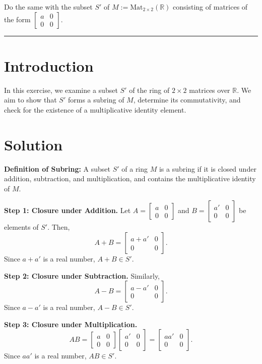 \documentclass[12pt]{amsart}
\theoremstyle{definition}
\numberwithin{equation}{section}
\newcommand{\R}{\mathbb{R}}
\begin{document}
\begin{exercise}{8} Do the same with the subset \(S'\) of \(M := \text{Mat}_{2 \times 2}(\R)\) consisting of matrices of the form \(\begin{bmatrix} a & 0 \\ 0 & 0 \end{bmatrix}\).

    \noindent\rule{\linewidth}{1pt}

    \section*{Introduction}
    
    In this exercise, we examine a subset \(S'\) of the ring of \(2 \times 2\) matrices over \(\R \). We aim to show that \(S'\) forms a subring of \(M\), determine its commutativity, and check for the existence of a multiplicative identity element.

    \section*{Solution}

    \noindent \textbf{Definition of Subring:} A subset \(S'\) of a ring \(M\) is a subring if it is closed under addition, subtraction, and multiplication, and contains the multiplicative identity of \(M\).

    \noindent \textbf{Step 1: Closure under Addition.}
    Let \(A = \begin{bmatrix} a & 0 \\ 0 & 0 \end{bmatrix}\) and \(B = \begin{bmatrix} a' & 0 \\ 0 & 0 \end{bmatrix}\) be elements of \(S'\). Then,
    \[
    A + B = \begin{bmatrix} a + a' & 0 \\ 0 & 0 \end{bmatrix}.
    \]
    Since \(a + a'\) is a real number, \(A + B \in S'\).

    \noindent \textbf{Step 2: Closure under Subtraction.}
    Similarly,
    \[
    A - B = \begin{bmatrix} a - a' & 0 \\ 0 & 0 \end{bmatrix}.
    \]
    Since \(a - a'\) is a real number, \(A - B \in S'\).

    \noindent \textbf{Step 3: Closure under Multiplication.}
    \[
    AB = \begin{bmatrix} a & 0 \\ 0 & 0 \end{bmatrix} \begin{bmatrix} a' & 0 \\ 0 & 0 \end{bmatrix} = \begin{bmatrix} aa' & 0 \\ 0 & 0 \end{bmatrix}.
    \]
    Since \(aa'\) is a real number, \(AB \in S'\).


\end{exercise}
\end{document}
